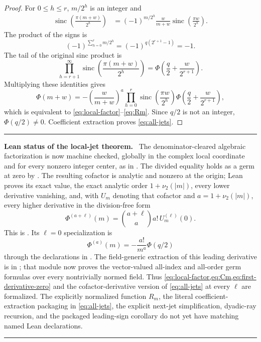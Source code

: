 \documentclass[11pt,oneside]{article}
\numberwithin{equation}{section}
\theoremstyle{plain}
\theoremstyle{definition}
\theoremstyle{remark}
\newcommand{\sinc}{\operatorname{sinc}}
\newenvironment{statusbox}[1]{%
  \par\medskip\noindent\begin{minipage}{\textwidth}%
  \color{DeepBlue}\hrule\vspace{5pt}%
  \color{black}\textbf{\color{DeepBlue}#1.}\ }{%
  \par\vspace{5pt}\color{DeepBlue}\hrule
  \end{minipage}\par\medskip}
\begin{document}
\begin{proof}
For $0\le h\le r$, $m/2^h$ is an integer and
\begin{align*}
 \sinc\!\left(\frac{\pi(m+w)}{2^h}\right)
 &=(-1)^{m/2^h}\frac{w}{m+w}
   \sinc\!\left(\frac{\pi w}{2^h}\right).
\end{align*}
The product of the signs is
\[
 (-1)^{\sum_{h=0}^{r}m/2^h}
 =(-1)^{q(2^{r+1}-1)}=-1.
\]
The tail of the original sinc product is
\[
 \prod_{h=r+1}^{\infty}
 \sinc\!\left(\frac{\pi(m+w)}{2^h}\right)
 =\Phi\!\left(\frac q2+\frac{w}{2^{r+1}}\right).
\]
Multiplying these identities gives
\[
 \Phi(m+w)=-\left(\frac{w}{m+w}\right)^a
 \prod_{h=0}^{r}\sinc\!\left(\frac{\pi w}{2^h}\right)
 \Phi\!\left(\frac q2+\frac{w}{2^{r+1}}\right),
\]
which is equivalent to \cref{eq:local-factor}--\cref{eq:Rm}.  Since $q/2$ is not an integer, $\Phi(q/2)\ne0$.  Coefficient extraction proves \cref{eq:all-jets}.
\end{proof}

\begin{statusbox}{Lean status of the local-jet theorem}
The denominator-cleared algebraic factorization is now machine checked,
globally in the complex local coordinate and for every nonzero integer
center, as
 in
.  The divided equality holds as a
germ at zero by
.
The resulting cofactor is analytic and nonzero at the origin; Lean proves
its exact value, the exact analytic order \(1+\nu_2(|m|)\), every lower
derivative vanishing, and, with \(U_m\) denoting that cofactor and
\(a=1+\nu_2(|m|)\), every higher derivative in the division-free form
\[
 \Phi^{(a+\ell)}(m)=\binom{a+\ell}{a}a!\,U_m^{(\ell)}(0).
\]
This is
.  Its
\(\ell=0\) specialization is
\[
 \Phi^{(a)}(m)=-\frac{a!}{m^a}\Phi(q/2)
\]
through the declarations in .  The
field-generic extraction of this leading derivative is in
; that module now proves the vector-valued all-index and
all-order germ formulas over every nontrivially normed field.  Thus
\cref{eq:local-factor,eq:Cm,eq:first-derivative-zero} and the
cofactor-derivative version of \cref{eq:all-jets} at every \(\ell\) are
formalized.  The explicitly normalized function \(R_m\), the literal
coefficient-extraction packaging in \cref{eq:all-jets}, the explicit
next-jet simplification, dyadic-ray recursion, and the packaged leading-sign
corollary do not yet have matching named Lean declarations.
\end{statusbox}
\end{document}
